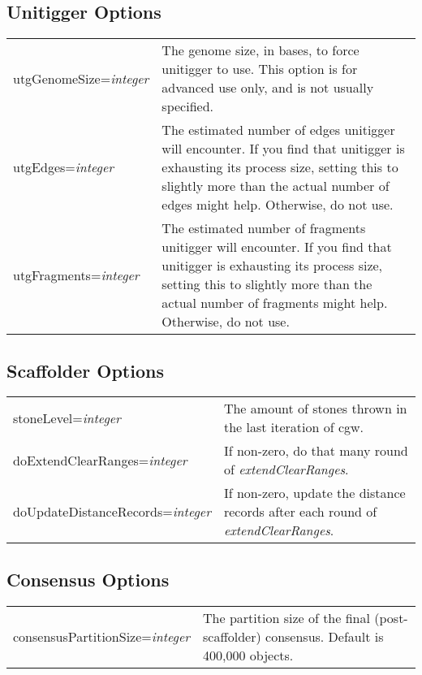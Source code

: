 \documentclass[twoside,11pt]{article}
\begin{document}
\subsection{Unitigger Options}

\begin{longtable}{lp{3.0in}}
utgGenomeSize={\it integer} &
The genome size, in bases, to force unitigger to use.  This option is
for advanced use only, and is not usually specified.
\\

utgEdges={\it integer} &
The estimated number of edges unitigger will encounter.  If you find that unitigger
is exhausting its process size, setting this to slightly more than the actual number of edges
might help.  Otherwise, do not use.
\\

utgFragments={\it integer} &
The estimated number of fragments unitigger will encounter.  If you find that unitigger
is exhausting its process size, setting this to slightly more than the actual number of fragments
might help.  Otherwise, do not use.
\\
\end{longtable}



\subsection{Scaffolder Options}

\begin{longtable}{lp{3.0in}}
stoneLevel={\it integer} &
The amount of stones thrown in the last iteration of cgw.
\\

doExtendClearRanges={\it integer} &
If non-zero, do that many round of {\it extendClearRanges}.
\\

doUpdateDistanceRecords={\it integer} &
If non-zero, update the distance records after each round of {\it extendClearRanges}.
\\
\end{longtable}



\subsection{Consensus Options}

\begin{longtable}{lp{3.0in}}
consensusPartitionSize={\it integer} &
The partition size of the final (post-scaffolder) consensus.  Default
is 400,000 objects.
\\
\end{longtable}
\end{document}

